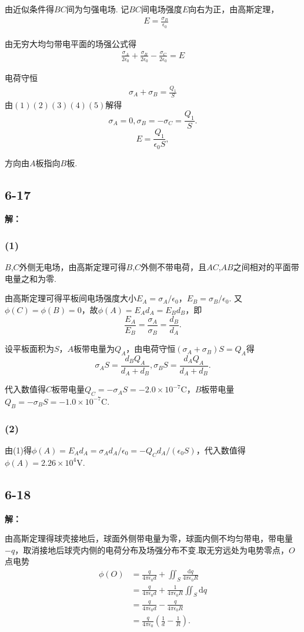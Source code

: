 \documentclass[twocolumn]{ctexart}
\newcommand{\sol}[1]{\subsection*{#1}\noindent\textbf{解：}
	
}
\begin{document}
	由近似条件得$BC$间为匀强电场. 记$BC$间电场强度$E$向右为正，由高斯定理，
	\begin{align}
		&E=\frac{\sigma_B}{\epsilon_0}
	\end{align}
	
	由无穷大均匀带电平面的场强公式得
	\begin{align}
		\frac{\sigma_A}{2\epsilon_0}+\frac{\sigma_B}{2\epsilon_0}-\frac{\sigma_C}{2\epsilon_0}=E
	\end{align}
	
	电荷守恒
	\begin{align}
		\sigma_A+\sigma_B=\frac{Q_1}{S}
	\end{align}
	由$(1)(2)(3)(4)(5)$解得
	$$\sigma_A=0,\sigma_B=-\sigma_C=\frac{Q_1}{S}.$$
	$$E=\frac{Q_1}{\epsilon_0S},$$
	
	方向由$A$板指向$B$板.
	
	\sol{6-17}
	\subsubsection*{(1)}
	
	$B$,$C$外侧无电场，由高斯定理可得$B$,$C$外侧不带电荷，且$AC$,$AB$之间相对的平面带电量之和为零.
	
	由高斯定理可得平板间电场强度大小$E_{A}=\sigma_A/\epsilon_0$，$E_{B}=\sigma_B/\epsilon_0$. 又$\phi(C)=\phi(B)=0$，故$\phi(A)=E_Ad_A=E_Bd_B$，即
	$$\frac{E_A}{E_B}=\frac{\sigma_A}{\sigma_B}=\frac{d_B}{d_A}.$$
	
	设平板面积为$S$，$A$板带电量为$Q_A$，由电荷守恒$\left(\sigma_A+\sigma_B\right)S=Q_A$得
	$$\sigma_AS=\frac{d_BQ_A}{d_A+d_B},\sigma_BS=\frac{d_AQ_A}{d_A+d_B}.$$
	
	代入数值得$C$板带电量$Q_C=-\sigma_AS=-2.0\times10^{-7}\mathrm{C}$，$B$板带电量$Q_B=-\sigma_BS=-1.0\times10^{-7}\mathrm{C}$.
	
	\subsubsection*{(2)}
	由(1)得$\phi(A)=E_Ad_A=\sigma_Ad_A/\epsilon_0=-Q_Cd_A/(\epsilon_0S)$，代入数值得$\phi(A)=2.26\times10^{4}\mathrm{V}$.
	
	\sol{6-18}
	
	由高斯定理得球壳接地后，球面外侧带电量为零，球面内侧不均匀带电，带电量$-q$，取消接地后球壳内侧的电荷分布及场强分布不变.取无穷远处为电势零点，$O$点电势
	\begin{align*}
		\phi(O)&=\frac{q}{4\pi\epsilon_0 d}+\iint_{S}\frac{\mathrm{d}q}{4\pi\epsilon_0{R}}\\
		&=\frac{q}{4\pi\epsilon_0 d}+\frac{1}{4\pi\epsilon_0{R}}\iint_{S}\mathrm{d}q\\
		&=\frac{q}{4\pi\epsilon_0 d}-\frac{q}{4\pi\epsilon_0{R}}\\
		&=\frac{q}{4\pi\epsilon_0}\left(\frac{1}{d}-\frac{1}{R}\right).
	\end{align*}
	
\end{document}

